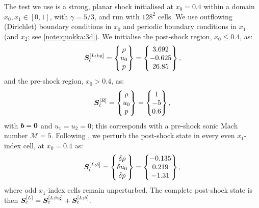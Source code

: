 The test we use is a strong, planar shock initialised at $x_0 = 0.4$ within a domain $x_0, x_1 \in [0,1]$, with $\gamma = 5/3$, and run with $128^2$ cells. We use outflowing (Dirichlet) boundary conditions in $x_0$ and periodic boundary conditions in $x_1$ (and $x_2$; see \cref{note:quokka:3d}). We initialise the post-shock region, $x_0 \leq 0.4$, as:
\begin{align}
    \bm{S}_\mathrm{c}^{[L; \mathrm{bg}]}
        = \begin{Bmatrix}
                \rho \\
                u_0 \\
                p
            \end{Bmatrix}
        = \begin{Bmatrix}
                3.692 \\
                -0.625 \\
                26.85
            \end{Bmatrix}
    ,
\end{align}
and the pre-shock region, $x_0 > 0.4$, as:
\begin{align}
    \bm{S}_\mathrm{c}^{[R]}
        = \begin{Bmatrix}
                \rho \\
                u_0 \\
                p
            \end{Bmatrix}
        = \begin{Bmatrix}
                1 \\
                -5 \\
                0.6
            \end{Bmatrix}
    ,
\end{align}
with $\bm{b} = \bm{0}$ and $u_1 = u_2 = 0$; this corresponds with a pre-shock sonic Mach number $\mathcal{M} = 5$. Following \citet{Quirk94a}, we perturb the post-shock state in every even $x_1$-index cell, at $x_0 = 0.4$ as:
\begin{align}
    \bm{S}_\mathrm{c}^{[L; \delta]}
        = \begin{Bmatrix}
                \delta\rho \\
                \delta u_0 \\
                \delta p
            \end{Bmatrix}
        = \begin{Bmatrix}
                -0.135 \\
                0.219 \\
                -1.31
            \end{Bmatrix}
    ,
\end{align}
where odd $x_1$-index cells remain unperturbed. The complete post-shock state is then $\bm{S}_\mathrm{c}^{[L]} = \bm{S}_\mathrm{c}^{[L; \mathrm{bg}]} + \bm{S}_\mathrm{c}^{[L; \delta]}$.

